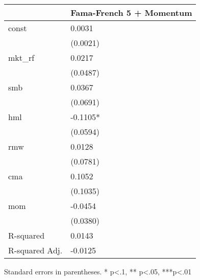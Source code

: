 \begin{table}
\caption{}
\label{}
\begin{center}
\begin{tabular}{ll}
\hline
               & Fama-French 5 + Momentum  \\
\hline
const          & 0.0031                    \\
               & (0.0021)                  \\
mkt\_rf        & 0.0217                    \\
               & (0.0487)                  \\
smb            & 0.0367                    \\
               & (0.0691)                  \\
hml            & -0.1105*                  \\
               & (0.0594)                  \\
rmw            & 0.0128                    \\
               & (0.0781)                  \\
cma            & 0.1052                    \\
               & (0.1035)                  \\
mom            & -0.0454                   \\
               & (0.0380)                  \\
R-squared      & 0.0143                    \\
R-squared Adj. & -0.0125                   \\
\hline
\end{tabular}
\end{center}
\end{table}
\bigskip
Standard errors in parentheses. \newline 
* p<.1, ** p<.05, ***p<.01